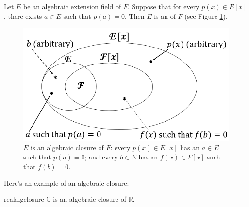 
\begin{defn}\label{def:algclosure}  
Let $E$ be an algebraic extension field of $F$. Suppose that for every $p(x) \in E[x]$, there exists $a \in E$ such that $p(a)=0$.  Then  $E$ is  an  of $F$ (see Figure \ref{algebraicclosure}).
\end{defn}

\begin{figure}
\begin{center}
\includegraphics[scale=0.35]{images/algebraic_closure.png}
\caption{$E$ is an algebraic closure of $F$:  every $p(x)\in E[x]$ has an $a\in E$ such that $p(a)=0$; and every $b\in E$ has an $f(x)\in F[x]$ such that $f(b)=0$.}\label{algebraicclosure}
\end{center}
\end{figure}

Here's an example of an algebraic closure:

\begin{prop}{realalgclosure}
$\mathbb{C}$ is an algebraic closure of $\mathbb{R}$.
\end{prop}



